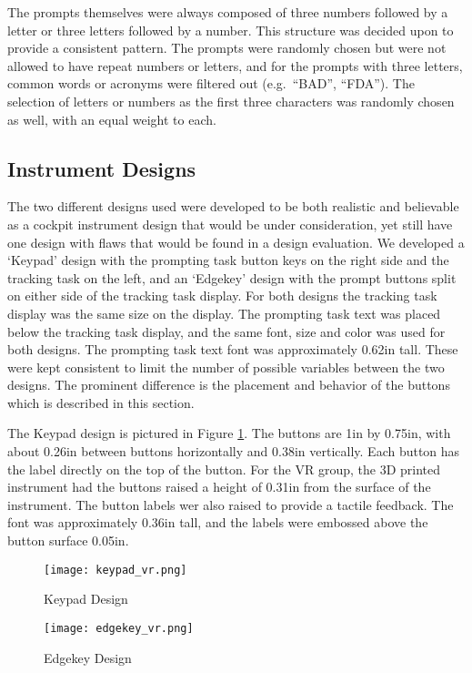 The prompts themselves were always composed of three numbers followed by a letter or three letters followed by a number.
This structure was decided upon to provide a consistent pattern.
The prompts were randomly chosen but were not allowed to have repeat numbers or letters, and for the prompts with three letters, common words or acronyms were filtered out (e.g.\ ``BAD'', ``FDA'').
The selection of letters or numbers as the first three characters was randomly chosen as well, with an equal weight to each.

\subsection{Instrument Designs}

The two different designs used were developed to be both realistic and believable as a cockpit instrument design that would be under consideration, yet still have one design with flaws that would be found in a design evaluation.
We developed a `Keypad' design with the prompting task button keys on the right side and the tracking task on the left, and an `Edgekey' design with the prompt buttons split on either side of the tracking task display.
For both designs the tracking task display was the same size on the display.
The prompting task text was placed below the tracking task display, and the same font, size and color was used for both designs.
The prompting task text font was approximately 0.62in tall.
These were kept consistent to limit the number of possible variables between the two designs.
The prominent difference is the placement and behavior of the buttons which is described in this section.

The Keypad design is pictured in Figure \ref{fig:de_keypad_design}.
The buttons are 1in by 0.75in, with about 0.26in between buttons horizontally and 0.38in vertically.
Each button has the label directly on the top of the button.
For the VR group, the 3D printed instrument had the buttons raised a height of 0.31in from the surface of the instrument.
The button labels wer also raised to provide a tactile feedback.
The font was approximately 0.36in tall, and the labels were embossed above the button surface 0.05in.

\begin{figure}
    \texttt{[image: keypad\_vr.png]}
    \caption{Keypad Design}
    \label{fig:de_keypad_design}
\end{figure}

\begin{figure}
    \texttt{[image: edgekey\_vr.png]}
    \caption{Edgekey Design}
    \label{fig:de_edgekey_design}
\end{figure}

